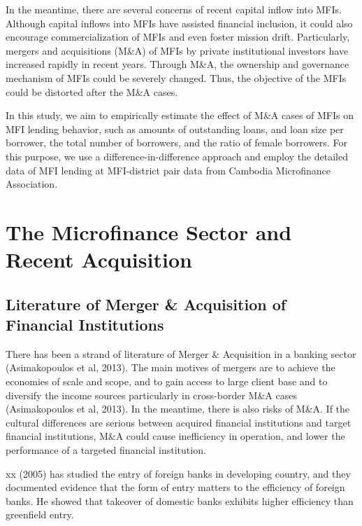 \documentclass[a4j,12pt]{article}
\begin{document}
In the meantime, there are several concerns of recent capital inflow into MFIs. Although capital inflows into MFIs have assisted financial inclusion, it could also encourage commercialization of MFIs and even foster mission drift. Particularly, mergers and acquisitions (M\&A) of MFIs by private institutional investors have increased rapidly in recent years. Through M\&A, the ownership and governance mechanism of MFIs could be severely changed. Thus, the objective of the MFIs could be distorted after the M\&A cases.


In this study, we aim to empirically estimate the effect of M\&A cases of MFIs on MFI lending behavior, such as amounts of outstanding loans, and loan size per borrower, the total number of borrowers, and the ratio of female borrowers. For this purpose, we use a difference-in-difference approach and employ the detailed data of MFI lending at MFI-district pair data from Cambodia Microfinance Association.


\section{The Microfinance Sector and Recent Acquisition}
\subsection{Literature of Merger \& Acquisition of Financial Institutions }
There has been a strand of literature of Merger \& Acquisition in a banking sector (Asimakopoulos et al, 2013). The main motives of mergers are to achieve the economies of scale and scope, and to gain access to large client base and to diversify the income sources particularly in cross-border M\&A cases (Asimakopoulos et al, 2013). In the meantime, there is also risks of M\&A. If the cultural differences are serious between acquired financial institutions and target financial institutions, M\&A could cause inefficiency in operation, and lower the performance of a targeted financial institution.


xx (2005) has studied the entry of foreign banks in developing country, and they documented evidence that the form of entry matters to the efficiency of foreign banks. He showed that takeover of domestic banks exhibits higher efficiency than greenfield entry.
\end{document}

